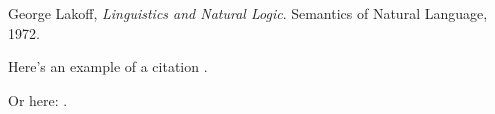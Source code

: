 \documentclass[english, 11pt]{article}
\begin{document}
\begin{thebibliography}{999}
	George Lakoff,
  	\emph{Linguistics and Natural Logic}.
  	Semantics of Natural Language,
  	1972.
\end{thebibliography}
Here's an example of a citation \citep{lol}.

Or here: \cite{lol}.



\end{document}

